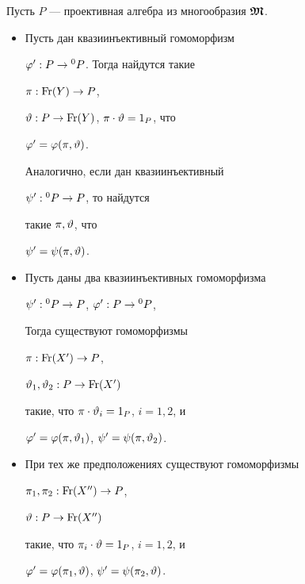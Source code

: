 \begin{thm}


Пусть $P$ --- проективная алгебра из многообразия $\boldsymbol{\frak M}$.


\begin{itemize}


\item[(1)] Пусть дан квазиинъективный гомоморфизм


$\varphi' : P\to {}^0 P$. Тогда найдутся такие


$\pi:\operatorname{Fr}(Y)\to P$,


$\vartheta : P \to \operatorname{Fr}(Y)$, $\pi\cdot\vartheta=1_P $, что


$\varphi'=\varphi(\pi,\vartheta)$.


Аналогично, если дан квазиинъективный


$\psi' : {}^0 P\to P$, то найдутся


такие $\pi,\vartheta$, что


$\psi'=\psi(\pi,\vartheta)$.


\item[(2)] Пусть даны два квазиинъективных гомоморфизма


$\psi': {}^0 P\to P$, $\varphi' : P\to {}^0 P$,


Тогда существуют гомоморфизмы


$\pi : \operatorname{Fr}(X')\to P$,


$\vartheta_1,\vartheta_2 : P\to \operatorname{Fr}(X')$


такие, что $\pi\cdot\vartheta_i=1_P$, $i=1,2 $, и


$\varphi'=\varphi(\pi,\vartheta_1)$, $\psi'=\psi(\pi,\vartheta_2)$.


\item[(3)] При тех же предположениях существуют гомоморфизмы


$\pi_1,\pi_2 : \operatorname{Fr}(X'')\to P$,


$\vartheta : P\to \operatorname{Fr}(X'')$


такие, что $\pi_i\cdot\vartheta=1_P$, $i=1,2 $, и


$\varphi'=\varphi(\pi_1,\vartheta)$, $\psi'=\psi(\pi_2,\vartheta)$.


\end{itemize}


\end{thm}





